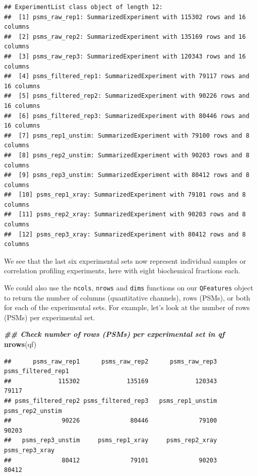 \documentclass[9pt,a4paper,]{extarticle}
\newenvironment{Shaded}{\begin{snugshade}}{\end{snugshade}}
\newcommand{\DocumentationTok}[1]{\textcolor[rgb]{0.56,0.35,0.01}{\textbf{\textit{#1}}}}
\newcommand{\FunctionTok}[1]{\textcolor[rgb]{0.13,0.29,0.53}{\textbf{#1}}}
\newcommand{\NormalTok}[1]{#1}
\begin{document}
\begin{verbatim}
## ExperimentList class object of length 12:
##  [1] psms_raw_rep1: SummarizedExperiment with 115302 rows and 16 columns
##  [2] psms_raw_rep2: SummarizedExperiment with 135169 rows and 16 columns
##  [3] psms_raw_rep3: SummarizedExperiment with 120343 rows and 16 columns
##  [4] psms_filtered_rep1: SummarizedExperiment with 79117 rows and 16 columns
##  [5] psms_filtered_rep2: SummarizedExperiment with 90226 rows and 16 columns
##  [6] psms_filtered_rep3: SummarizedExperiment with 80446 rows and 16 columns
##  [7] psms_rep1_unstim: SummarizedExperiment with 79100 rows and 8 columns
##  [8] psms_rep2_unstim: SummarizedExperiment with 90203 rows and 8 columns
##  [9] psms_rep3_unstim: SummarizedExperiment with 80412 rows and 8 columns
##  [10] psms_rep1_xray: SummarizedExperiment with 79101 rows and 8 columns
##  [11] psms_rep2_xray: SummarizedExperiment with 90203 rows and 8 columns
##  [12] psms_rep3_xray: SummarizedExperiment with 80412 rows and 8 columns
\end{verbatim}

We see that the last six experimental sets now represent individual samples or
correlation profiling experiments, here with eight biochemical fractions each.

We could also use the \texttt{ncols}, \texttt{nrows} and \texttt{dims} functions on our \texttt{QFeatures}
object to return the number of columns (quantitative channels), rows (PSMs),
or both for each of the experimental sets. For example, let's look at the number
of rows (PSMs) per experimental set.

\begin{Shaded}
\begin{Highlighting}[]
\DocumentationTok{\#\# Check number of rows (PSMs) per experimental set in qf}
\FunctionTok{nrows}\NormalTok{(qf)}
\end{Highlighting}
\end{Shaded}

\begin{verbatim}
##      psms_raw_rep1      psms_raw_rep2      psms_raw_rep3 psms_filtered_rep1 
##             115302             135169             120343              79117 
## psms_filtered_rep2 psms_filtered_rep3   psms_rep1_unstim   psms_rep2_unstim 
##              90226              80446              79100              90203 
##   psms_rep3_unstim     psms_rep1_xray     psms_rep2_xray     psms_rep3_xray 
##              80412              79101              90203              80412
\end{verbatim}
\end{document}
